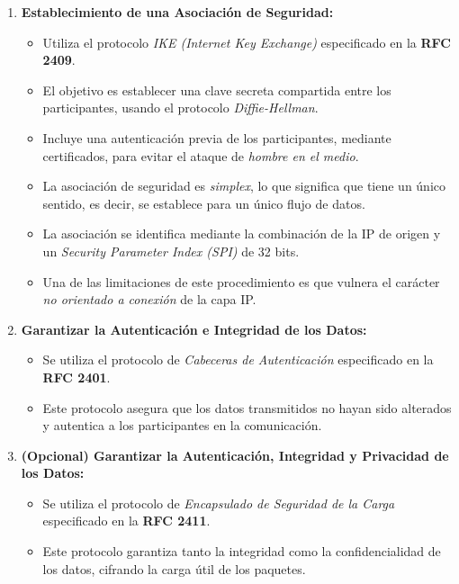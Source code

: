 \documentclass[a4paper,12pt]{article}
\begin{document}
\begin{enumerate}
    \item \textbf{Establecimiento de una Asociación de Seguridad:} 
    \begin{itemize}
        \item Utiliza el protocolo \textit{IKE (Internet Key Exchange)} especificado en la \textbf{RFC 2409}.
        \item El objetivo es establecer una clave secreta compartida entre los participantes, usando el protocolo \textit{Diffie-Hellman}.
        \item Incluye una autenticación previa de los participantes, mediante certificados, para evitar el ataque de \textit{hombre en el medio}.
        \item La asociación de seguridad es \textit{simplex}, lo que significa que tiene un único sentido, es decir, se establece para un único flujo de datos.
        \item La asociación se identifica mediante la combinación de la IP de origen y un \textit{Security Parameter Index (SPI)} de 32 bits.
        \item Una de las limitaciones de este procedimiento es que vulnera el carácter \textit{no orientado a conexión} de la capa IP.
    \end{itemize}

    \item \textbf{Garantizar la Autenticación e Integridad de los Datos:} 
    \begin{itemize}
        \item Se utiliza el protocolo de \textit{Cabeceras de Autenticación} especificado en la \textbf{RFC 2401}.
        \item Este protocolo asegura que los datos transmitidos no hayan sido alterados y autentica a los participantes en la comunicación.
    \end{itemize}

    \item \textbf{(Opcional) Garantizar la Autenticación, Integridad y Privacidad de los Datos:} 
    \begin{itemize}
        \item Se utiliza el protocolo de \textit{Encapsulado de Seguridad de la Carga} especificado en la \textbf{RFC 2411}.
        \item Este protocolo garantiza tanto la integridad como la confidencialidad de los datos, cifrando la carga útil de los paquetes.
    \end{itemize}
\end{enumerate}
\end{document}
